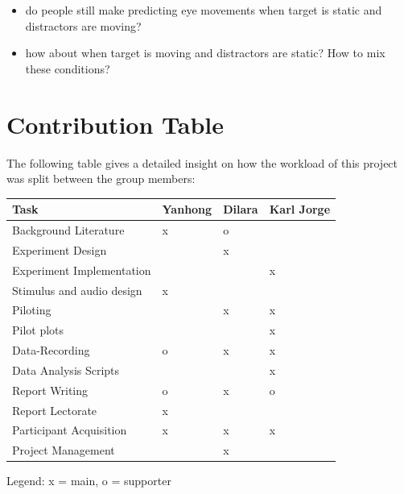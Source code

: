 \documentclass[
  12pt,
  letterpaper,
  DIV=11,
  numbers=noendperiod]{scrreprt}
\begin{document}
\begin{itemize}
\item
  do people still make predicting eye movements when target is static
  and distractors are moving?
\item
  how about when target is moving and distractors are static? How to mix
  these conditions?
\end{itemize}

\chapter{Contribution Table}\label{contribution-table}

The following table gives a detailed insight on how the workload of this
project was split between the group members:

\begin{longtable}[]{@{}llll@{}}
\toprule\noalign{}
Task & Yanhong & Dilara & Karl Jorge \\
\midrule\noalign{}
\endhead
\bottomrule\noalign{}
\endlastfoot
Background Literature & x & o & \\
Experiment Design & & x & \\
Experiment Implementation & & & x \\
Stimulus and audio design & x & & \\
Piloting & & x & x \\
Pilot plots & & & x \\
Data-Recording & o & x & x \\
Data Analysis Scripts & & & x \\
Report Writing & o & x & o \\
Report Lectorate & x & & \\
Participant Acquisition & x & x & x \\
Project Management & & x & \\
\end{longtable}

Legend: x = main, o = supporter
\end{document}
